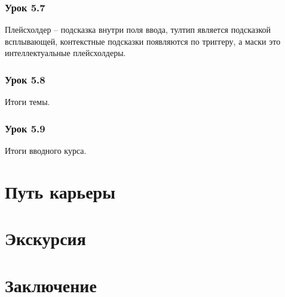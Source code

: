 \documentclass[variant=practice]{bsuir}
\begin{document}
\subsection{Урок 5.7} Плейсхолдер -- подсказка внутри поля ввода, тултип
является подсказкой всплывающей, контекстные подсказки появляются по триггеру, а
маски это интеллектуальные плейсхолдеры.

\subsection{Урок 5.8} Итоги темы.

\subsection{Урок 5.9} Итоги вводного курса.

\chapter{Путь карьеры}
\chapter{Экскурсия}

\chapter*{Заключение}


\end{document}
